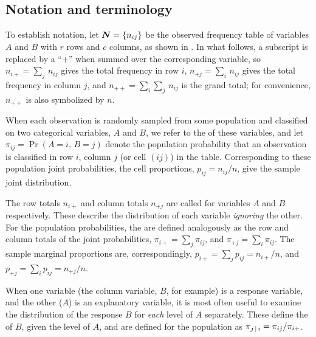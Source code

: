 \documentclass[10pt,krantz2]{krantz}\usepackage[]{graphicx}\usepackage[]{color}
\begin{document}
\subsection{Notation and terminology}\label{sec:twoway-notation}
To establish notation, let \(\bm{N}  =  \{  n_{ij}  \}\) be the
observed frequency table of variables \(A\) and \(B\) with \(r\) rows
and \(c\) columns, as shown in .
In what follows, a subscript is replaced by a ``$+$''
when summed over the corresponding variable, so \(n_{i+}  =  \sum_j \,
n_{ij}\) gives the total frequency in row \(i\), \(n_{+j}  =  \sum_i \,
n_{ij}\) gives the total frequency in column \(j\), and \(n_{++}  =
\sum_i \sum_j \,  n_{ij}\) is the grand total; for convenience,
\(n_{++}\) is also symbolized by \(n\).


When each observation is randomly sampled from some population
and classified on two categorical variables, $A$ and $B$,
we refer to the  of these variables,
and let $\pi_{ij} = \Pr(A=i,\,B=j)$ denote the population
probability that
an observation is classified in row $i$, column $j$ (or cell $(ij)$)
in the table.
Corresponding to these population joint probabilities, the
cell proportions, $p_{ij} = n_{ij} / n$, give the sample joint
distribution.

The row totals $n_{i+}$ and column totals $n_{+j}$ are called
 for variables $A$ and $B$ respectively.
These describe the distribution of each variable \emph{ignoring} the other.
For the population probabilities, the 
are defined analogously as the row and column totals of the
joint probabilities,
$\pi_{i+} = \sum_j \pi_{ij}$, and
$\pi_{+j} = \sum_i \pi_{ij}$.
The sample marginal proportions are, correspondingly,
$p_{i+} = \sum_j p_{ij} = n_{i+} / n$, and
$p_{+j} = \sum_i p_{ij} = n_{+j} / n$.

When one variable (the column variable, $B$, for example) is a response
variable, and the other ($A$) is an explanatory variable,
it is most often useful to examine the distribution of the response $B$
for \emph{each} level of $A$ separately.
These define the  of $B$, given the
level of $A$, and are defined for the population as
$\pi_{j\, | \, i} = \pi_{ij} / \pi_{i+}$.
\end{document}
